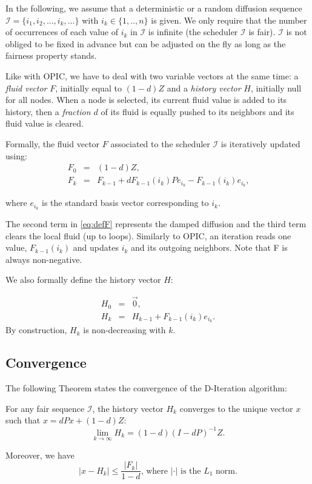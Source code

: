 \documentclass{llncs}
\begin{document}
In the following, we assume that a deterministic or a random diffusion sequence $\mathcal{I} = \{i_1, i_2, ..., i_k,...\}$ with $i_k \in \{1,..,n\}$ is given. We only require that the number of occurrences of each value of $i_k$ in $\mathcal{I}$ is infinite (the scheduler $ \mathcal{I} $ is fair). $\mathcal{I}$ is not obliged to be fixed in advance but can be adjusted on the fly as long as the fairness property stands.





Like with OPIC, we have to deal with two variable vectors at the same time: a \emph{fluid vector} $F$, initially equal to $ (1-d)Z $ and a \emph{history vector} $H$, initially null for all nodes.
When a node is selected, its current fluid value is added to its history, then a \emph{fraction $ d $} of its fluid is equally pushed to its neighbors and its fluid value is cleared.

Formally, the fluid vector $ F $ associated to the scheduler $ \mathcal{I} $ is iteratively updated using:
\begin{eqnarray}
F_0 &=& (1-d) Z\text{,}\\
F_k &=& F_{k-1} + d F_{k-1}(i_k) P e_{i_k}  - F_{k-1}(i_k) e_{i_k}\text{,}\label{eq:defF}
\end{eqnarray}

where $e_{i_k}$ is the standard basis vector corresponding to $ i_k $.

The second term in \eqref{eq:defF} represents the damped diffusion and the third term clears the local fluid (up to loops). Similarly to OPIC, an iteration reads one value, $ F_{k-1}(i_k) $ and updates $ i_k $ and its outgoing neighbors. Note that F is always non-negative.

We also formally define the history vector $H$:

\begin{eqnarray}
H_0 &=& \vec{0}\text{,} \\
H_k &=& H_{k-1}+F_{k-1}(i_k)e_{i_k}\text{.}
\end{eqnarray}
By construction, $H_k$ is non-decreasing with $ k $.

\subsection{Convergence}

The following Theorem states the convergence of the D-Iteration algorithm:

\begin{theorem}
\label{thm:conv}
For any fair sequence $\mathcal{I}$, the history vector $H_k$ converges to the unique vector $x$ such that $x=dPx + (1-d)Z$:
$$\lim\limits_{k\rightarrow\infty}H_k=(1-d)(I-dP)^{-1}Z\text{.}$$

Moreover, we have
\begin{equation}\label{eq:SL}
|x - H_k| \leq  \frac{|F_k|}{1-d}\text{, where $|\cdot|$ is the $L_1$ norm.}
\end{equation}


\end{theorem}
\end{document}
